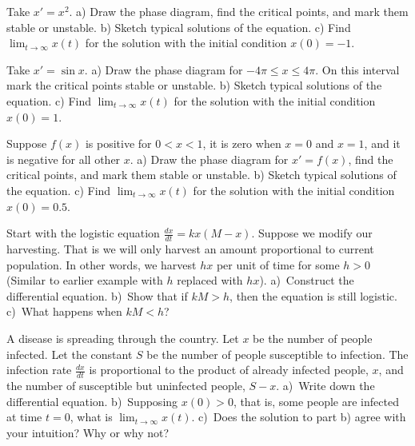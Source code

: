 \documentclass[12pt]{book}
\begin{document}
\begin{exercise}
Take $x' = x^2$.
a) Draw the phase diagram,
find the critical points, and mark them stable or unstable.
b) Sketch typical solutions of the equation.
c) Find $\displaystyle \lim_{t\to \infty} x(t)$ for the solution with the initial condition
$x(0) = -1$.
\end{exercise}

\begin{exercise}
Take $x' = \sin x$.
a) Draw the phase diagram for $-4\pi \leq x \leq 4\pi$.  On this interval
mark the critical points stable or unstable.
b) Sketch typical solutions of the equation.
c) Find $\displaystyle \lim_{t\to \infty} x(t)$ for the solution with the initial condition
$x(0) = 1$.
\end{exercise}

\begin{samepage}
\begin{exercise}
Suppose $f(x)$ is positive for $0 < x < 1$, it is zero when $x=0$ and $x=1$,
and it is negative for all other $x$.
a) Draw the phase diagram for $x' = f(x)$,
find the critical points, and mark them stable or unstable.
b) Sketch typical solutions of the equation.
c) Find $\displaystyle \lim_{t\to \infty} x(t)$ for the solution with the initial condition
$x(0) = 0.5$.
\end{exercise}
\end{samepage}

\begin{exercise}
Start with the logistic equation
$\frac{dx}{dt} = kx(M-x)$.
Suppose we modify our harvesting.  That is we will only harvest 
an amount proportional to current population.  In other words, we harvest $hx$
per unit of time
for some $h > 0$ (Similar to earlier example with $h$ replaced with $hx$).
a)~Construct the differential equation.  b)~Show that if $kM > h$, then
the equation is still logistic.  c)~What happens when $kM < h$?
\end{exercise}

\begin{exercise}
A disease is spreading through the country.  Let $x$ be the number of people
infected.  Let the constant $S$ be the number of people susceptible to
infection.  The infection rate $\frac{dx}{dt}$ is proportional to the product
of already infected people, $x$, and the number of susceptible but
uninfected people, $S-x$.
a)~Write down the differential equation.
b)~Supposing $x(0) > 0$, that is, some people are infected at time $t=0$,
what is
$\displaystyle \lim_{t\to\infty} x(t)$.
c)~Does the solution to part b) agree with your intuition?  Why or why not?
\end{exercise}
\end{document}
